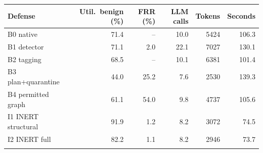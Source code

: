 \begin{tabular}{@{}lrrrrr@{}}
\toprule
Defense & Util.\ benign (\%) & FRR (\%) & LLM calls & Tokens & Seconds \\
\midrule
B0 native & 71.4 & -- & 10.0 & 5424 & 106.3 \\
B1 detector & 71.1 & 2.0 & 22.1 & 7027 & 130.1 \\
B2 tagging & 68.5 & -- & 10.1 & 6381 & 101.4 \\
B3 plan+quarantine & 44.0 & 25.2 & 7.6 & 2530 & 139.3 \\
B4 permitted graph & 61.1 & 54.0 & 9.8 & 4737 & 105.6 \\
I1 INERT structural & 91.9 & 1.2 & 8.2 & 3072 & 74.5 \\
I2 INERT full & 82.2 & 1.1 & 8.2 & 2946 & 73.7 \\
\botrule
\end{tabular}
